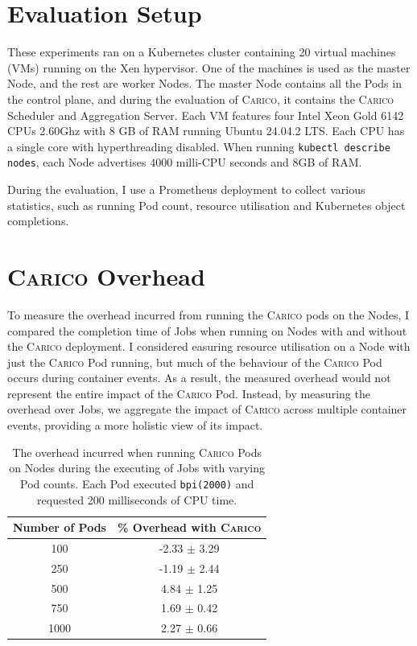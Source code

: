 \section{Evaluation Setup}
These experiments ran on a Kubernetes cluster containing 20 virtual machines
(VMs) running on the Xen hypervisor. One of the machines is used as the master
Node, and the rest are worker Nodes. The master Node contains all the Pods in
the control plane, and during the evaluation of \textsc{Carico}, it contains the \textsc{Carico}
Scheduler and Aggregation Server. Each VM features four Intel Xeon Gold 6142
CPUs \@ 2.60Ghz with 8 GB of RAM running Ubuntu 24.04.2 LTS. Each CPU has a
single core with hyperthreading disabled. When running \texttt{kubectl describe
nodes}, each Node advertises $4000$ milli-CPU seconds and 8GB of RAM.

During the evaluation, I use a Prometheus deployment \cite{} to collect various
statistics, such as running Pod count, resource utilisation and Kubernetes
object completions.

\section{\textsc{Carico} Overhead}
\label{sec:eval-overhead}
To measure the overhead incurred from running the \textsc{Carico} pods on the Nodes, I
compared the completion time of Jobs when running on Nodes with and without the
\textsc{Carico} deployment. I considered easuring resource utilisation on a Node with
just the \textsc{Carico} Pod running, but much of the behaviour of the
\textsc{Carico} Pod occurs during container events. As a result, the measured overhead
would not represent the entire impact of the \textsc{Carico} Pod. Instead, by measuring
the overhead over Jobs, we aggregate the impact of \textsc{Carico} across multiple
container events, providing a more holistic view of its impact.

\begin{table}[ht!]
\centering
    \begin{tabular}{|c|c|}
    \hline
    \textbf{Number of Pods} & \textbf{\% Overhead with \textsc{Carico}} \\
    \hline
        100 & -2.33 $\pm$ 3.29 \\
        250 & -1.19 $\pm$ 2.44 \\
        500 & 4.84  $\pm$ 1.25 \\
        750 & 1.69  $\pm$ 0.42 \\
        1000 & 2.27  $\pm$ 0.66 \\
    \hline
    \end{tabular}
    \label{tab:overhead}
    \caption{The overhead incurred when running \textsc{Carico} Pods on Nodes during the
    executing of Jobs with varying Pod counts. Each Pod executed
    \texttt{bpi(2000)} and requested 200 milliseconds of CPU time.}
\end{table}

